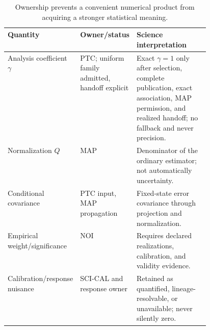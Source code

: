 \documentclass[10pt]{article}
\begin{document}
\begin{table}[h]
\centering\small
\begin{tabularx}{\linewidth}{@{}L{0.26\linewidth}L{0.20\linewidth}Y@{}}
\toprule Quantity & Owner/status & Science interpretation \\
\midrule
Analysis coefficient \(\gamma\) & PTC; uniform family admitted, handoff explicit & Exact \(\gamma=1\) only after selection, complete publication, exact association, MAP permission, and realized handoff; no fallback and never precision.\\
Normalization \(Q\) & MAP & Denominator of the ordinary estimator; not automatically uncertainty.\\
Conditional covariance & PTC input, MAP propagation & Fixed-state error covariance through projection and normalization.\\
Empirical weight/significance & NOI & Requires declared realizations, calibration, and validity evidence.\\
Calibration/response nuisance & SCI-CAL and response owner & Retained as quantified, lineage-resolvable, or unavailable; never silently zero.\\
\bottomrule
\end{tabularx}
\caption{Ownership prevents a convenient numerical product from acquiring a stronger statistical meaning.}
\end{table}

\clearpage
\end{document}
